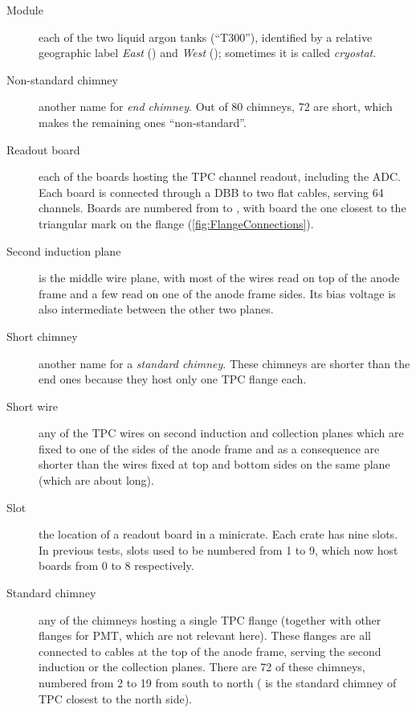 \begin{description}
  \item[Module]
    each of the two liquid argon tanks (``T300''), identified by
    a relative geographic label \emph{East} () and \emph{West}
    (); sometimes it is called \emph{cryostat}.

  \item[Non-standard chimney]
    another name for \emph{end chimney}.
    Out of 80 chimneys, 72 are short, which makes the remaining ones ``non-standard''.

  \item[Readout board]
    each of the boards hosting the TPC channel readout, including the ADC.
    Each board is connected through a DBB to two flat cables, serving 64 channels.
    Boards are numbered from  to , with board 
    the one closest to the triangular mark on the flange (\cref{fig:FlangeConnections}).

  \item[Second induction plane]
    is the middle wire plane,
    with most of the wires read on top of the anode frame and a few read on one
    of the anode frame sides.
    Its bias voltage is also intermediate between the other two planes.

  \item[Short chimney]
    another name for a \emph{standard chimney}. These chimneys are shorter
    than the end ones because they host only one TPC flange each.

  \item[Short wire]
    any of the TPC wires on second induction and collection planes which are
    fixed to one of the sides of the anode frame and as a consequence are
    shorter than the wires fixed at top and bottom sides on the same plane
    (which are about  long).

  \item[Slot]
    the location of a readout board in a minicrate. Each crate has nine slots.
    In previous tests, slots used to be numbered from 1 to 9, which now host
    boards from 0 to 8 respectively.

  \item[Standard chimney]
    any of the chimneys hosting a single TPC flange (together with other flanges
    for PMT, which are not relevant here). These flanges are all connected to
    cables at the top of the anode frame, serving the second induction or the
    collection planes. There are 72 of these chimneys,
    numbered from 2 to 19 from south to north (\eg {} is the
    standard chimney of TPC  closest to the north side).


\end{description}
